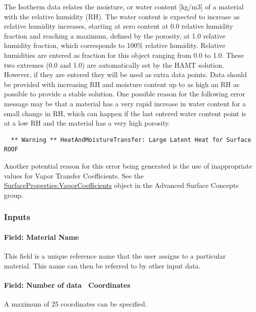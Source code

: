 The Isotherm data relates the moisture, or water content {[}kg/m3{]} of a material with the relative humidity (RH). The water content is expected to increase as relative humidity increases, starting at zero content at 0.0 relative humidity fraction and reaching a maximum, defined by the porosity, at 1.0 relative humidity fraction, which corresponds to 100\% relative humidity. Relative humidities are entered as fraction for this object ranging from 0.0 to 1.0. These two extremes (0.0 and 1.0) are automatically set by the HAMT solution. However, if they are entered they will be used as extra data points. Data should be provided with increasing RH and moisture content up to as high an RH as possible to provide a stable solution. One possible reason for the following error message may be that a material has a very rapid increase in water content for a small change in RH, which can happen if the last entered water content point is at a low RH and the material has a very high porosity.

\begin{lstlisting}
  ** Warning ** HeatAndMoistureTransfer: Large Latent Heat for Surface ROOF
\end{lstlisting}

Another potential reason for this error being generated is the use of inappropriate values for Vapor Transfer Coefficients. See the \hyperref[surfacepropertiesvaporcoefficients]{SurfaceProperties:VaporCoefficients} object in the Advanced Surface Concepts group.

\subsubsection{Inputs}\label{inputs-8-024}

\paragraph{Field: Material Name}\label{field-material-name-1}

This field is a unique reference name that the user assigns to a particular material. This name can then be referred to by other input data.

\paragraph{Field: Number of data ~Coordinates}\label{field-number-of-data-coordinates}

A maximum of 25 coordinates can be specified.

